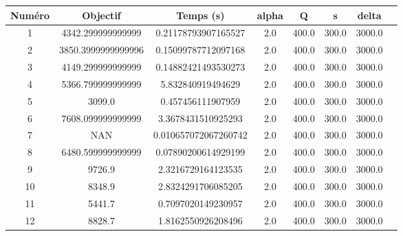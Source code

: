 \begin{tabular}{|c|c|c|c|c|c|c|c|}
\hline
 Numéro & Objectif & Temps (s) & alpha & Q & s & delta \\
\hline
1 & 4342.299999999999 & 0.21178793907165527 & 2.0 & 400.0 & 300.0 & 3000.0 \\ 
 \hline
2 & 3850.3999999999996 & 0.15099787712097168 & 2.0 & 400.0 & 300.0 & 3000.0 \\ 
 \hline
3 & 4149.299999999999 & 0.14882421493530273 & 2.0 & 400.0 & 300.0 & 3000.0 \\ 
 \hline
4 & 5366.799999999999 & 5.832840919494629 & 2.0 & 400.0 & 300.0 & 3000.0 \\ 
 \hline
5 & 3099.0 & 0.457456111907959 & 2.0 & 400.0 & 300.0 & 3000.0 \\ 
 \hline
6 & 7608.099999999999 & 3.3678431510925293 & 2.0 & 400.0 & 300.0 & 3000.0 \\ 
 \hline
7 & NAN & 0.010657072067260742 & 2.0 & 400.0 & 300.0 & 3000.0 \\ 
 \hline
8 & 6480.599999999999 & 0.07890200614929199 & 2.0 & 400.0 & 300.0 & 3000.0 \\ 
 \hline
9 & 9726.9 & 2.3216729164123535 & 2.0 & 400.0 & 300.0 & 3000.0 \\ 
 \hline
10 & 8348.9 & 2.8324291706085205 & 2.0 & 400.0 & 300.0 & 3000.0 \\ 
 \hline
11 & 5441.7 & 0.7097020149230957 & 2.0 & 400.0 & 300.0 & 3000.0 \\ 
 \hline
12 & 8828.7 & 1.8162550926208496 & 2.0 & 400.0 & 300.0 & 3000.0 \\ 
 \hline
\end{tabular}

